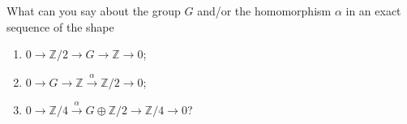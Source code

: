 What can you say about the group $G$ and/or the homomorphism $\alpha$ in an
exact sequence of the shape
\begin{enumerate}[label=(\alph*)]
	\item $0\to \mathbb{Z}/2 \to G\to \mathbb{Z}\to 0$;
	\item $0\to G\to \mathbb{Z}\stackrel{\alpha}{\longrightarrow} \mathbb{Z}/2\to 0$;
	\item $0\to \mathbb{Z}/4 \stackrel{\alpha}{\longrightarrow} G\oplus \mathbb{Z}/2 \to \mathbb{Z}/4\to 0$?
\end{enumerate}
